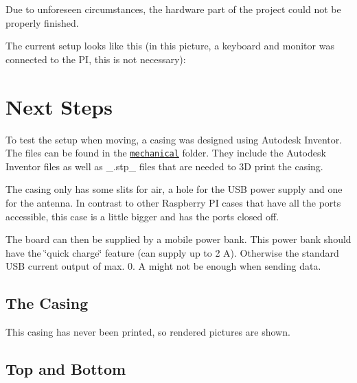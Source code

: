 Due to unforeseen circumstances, the hardware part of the project could not be properly finished.

The current setup looks like this (in this picture, a keyboard and monitor was connected to the PI, this is not necessary)\+: 

 

\section*{Next Steps}

To test the setup when moving, a casing was designed using Autodesk Inventor. The files can be found in the \href{https://github.com/itsBelinda/ENG5220-2020-Team13/blob/master/hardware/mechanical/case}{\tt {\ttfamily mechanical}} folder. They include the Autodesk Inventor files as well as \+\_\+.\+stp\+\_\+ files that are needed to 3D print the casing.

The casing only has some slits for air, a hole for the U\+SB power supply and one for the antenna. In contrast to other Raspberry PI cases that have all the ports accessible, this case is a little bigger and has the ports closed off.

The board can then be supplied by a mobile power bank. This power bank should have the \char`\"{}quick charge\char`\"{} feature (can supply up to 2 A). Otherwise the standard U\+SB current output of max. 0. A might not be enough when sending data.

\subsection*{The Casing}

This casing has never been printed, so rendered pictures are shown. 

 

\subsection*{Top and Bottom}

  